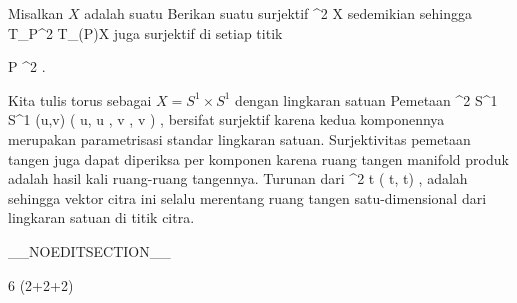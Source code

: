 {

Misalkan $X$ adalah suatu
Berikan suatu
surjektif
\maabbdisp {\varphi} {\R^2} {X
} {}
sedemikian sehingga
 { T_P\R^2 } { T_{\varphi(P)}X
} {}
juga surjektif di setiap titik

\mavergleichskette
{\vergleichskette
{ P
}
{ \in }{ \R^2
}
{  }{
}
{    }{
}
{   }{
}
}
{}{}{.}

}
{

Kita tulis torus sebagai $X=S^1 \times S^1$ dengan lingkaran satuan
Pemetaan
\maabbeledisp {\varphi} {\R^2} {S^1 \times S^1
} {(u,v)} {( \cos  u, \sin  u , \cos  v , \sin  v )
} {,}
bersifat surjektif karena kedua komponennya merupakan parametrisasi standar lingkaran satuan. Surjektivitas pemetaan tangen juga dapat diperiksa per komponen karena ruang tangen manifold produk adalah hasil kali ruang-ruang tangennya. Turunan dari
\maabbeledisp {} {\R} { \R^2
} { t } { ( \cos  t, \sin  t)
} {,}
adalah
 sehingga vektor citra ini selalu merentang ruang tangen satu-dimensional dari lingkaran satuan di titik citra.

}

__NOEDITSECTION__

{6 (2+2+2)}

